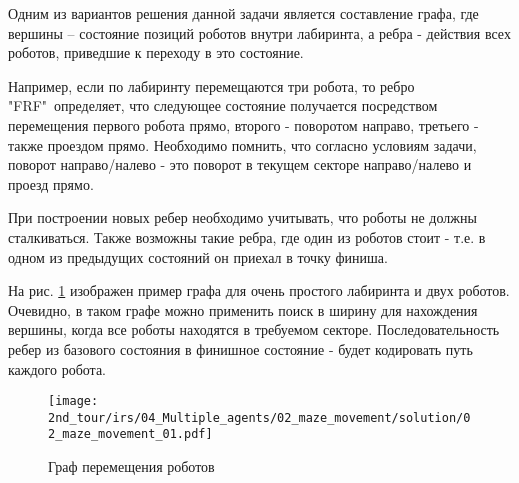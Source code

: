 \solutionSection

Одним из вариантов решения данной задачи является составление графа, где вершины – состояние позиций роботов внутри лабиринта, а ребра - действия всех роботов, приведшие к переходу в это состояние. 

Например, если по лабиринту перемещаются три робота, то ребро "FRF"\ определяет, что следующее состояние получается посредством перемещения первого робота прямо, второго - поворотом направо, третьего - также проездом прямо. Необходимо помнить, что согласно условиям задачи, поворот направо/налево - это поворот в текущем секторе направо/налево и проезд прямо. 

При построении новых ребер необходимо учитывать, что роботы не должны сталкиваться. Также возможны такие ребра, где один из роботов стоит - т.е. в одном из предыдущих состояний он приехал в точку финиша.

На рис. \ref{fig:02_maze_movement_01} изображен пример графа для очень простого лабиринта и двух роботов. 
Очевидно, в таком графе можно применить поиск в ширину для нахождения вершины, когда все роботы находятся в требуемом секторе. Последовательность ребер из базового состояния в финишное состояние - будет кодировать путь каждого робота.

\begin{figure}[H]
	\centering
	\texttt{[image: 2nd\_tour/irs/04\_Multiple\_agents/02\_maze\_movement/solution/02\_maze\_movement\_01.pdf]}
	\caption{Граф перемещения роботов}
	\label{fig:02_maze_movement_01}
\end{figure}


\codeExample

{}
